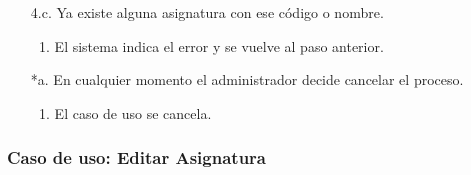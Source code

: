\documentclass{book}
\begin{document}
\begin{itemize}
\begin{itemize}
	\item[4.c.] Ya existe alguna asignatura con ese código o nombre.
		\begin{enumerate}
		\item El sistema indica el error y se vuelve al paso anterior.
		\end{enumerate}
	\item[*a.] En cualquier momento el administrador decide cancelar el proceso.
		\begin{enumerate}
		\item El caso de uso se cancela.
		\end{enumerate}
	\end{itemize}
\end{itemize}



\subsubsection*{Caso de uso: Editar Asignatura}
\end{document}
